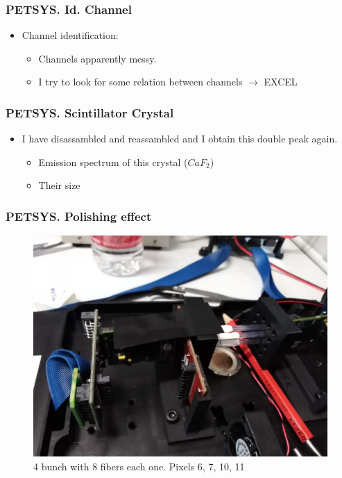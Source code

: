 \documentclass{beamer}
\begin{document}
\begin{frame}
\frametitle{PETSYS. Id. Channel}
\begin{itemize}
\item{} Channel identification: 
\begin{itemize}
\item{} Channels apparently messy.
\item{} I try to look for some relation between channels $\longrightarrow$ EXCEL
\end{itemize}

\end{itemize}

\end{frame}

\begin{frame}
\frametitle{PETSYS. Scintillator Crystal}
\begin{itemize}
\item{} I have disassambled and reassambled and I obtain this double peak again.
\begin{itemize}
	\item{} Emission spectrum of this crystal ($CaF_2$)
	\item{} Their size
\end{itemize}

\end{itemize}

\end{frame}



\begin{frame}
\frametitle{PETSYS. Polishing effect}

\begin{figure}[hbtp]
\centering
\includegraphics[scale=0.15]{PETSYS/Polishing_effect/Set_up_polishing.jpeg}
\caption{4 bunch with 8 fibers each one. Pixels 6, 7, 10, 11}
\end{figure}

\end{frame}
\end{document}

